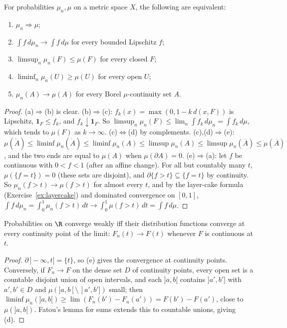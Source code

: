 \begin{theorem}[portmanteau]\label{thm:portmanteau}
For probabilities $\mu_n,\mu$ on a metric space $X$, the following are equivalent:
\begin{enumerate}[label=(\alph*)]
\item $\mu_n\Rightarrow\mu$;
\item $\int f\,d\mu_n\to\int f\,d\mu$ for every bounded Lipschitz $f$;
\item $\limsup_n\mu_n(F)\le\mu(F)$ for every closed $F$;
\item $\liminf_n\mu_n(U)\ge\mu(U)$ for every open $U$;
\item $\mu_n(A)\to\mu(A)$ for every Borel $\mu$-continuity set $A$.
\end{enumerate}
\end{theorem}
\begin{proof}
(a)$\Rightarrow$(b) is clear. (b)$\Rightarrow$(c): $f_k(x)=\max(0,1-k\,d(x,F))$ is Lipschitz, $\mathbf 1_F\le f_k$, and $f_k\downarrow\mathbf 1_F$. So $\limsup_n\mu_n(F)\le\lim_n\int f_k\,d\mu_n=\int f_k\,d\mu$, which tends to $\mu(F)$ as
$k\to\infty$. (c)$\Leftrightarrow$(d) by complements. (c),(d)$\Rightarrow$(e): $\mu(\mathring A)\le\liminf\mu_n(\mathring A)\le\liminf\mu_n(A)\le\limsup\mu_n(A)\le\limsup\mu_n(\overline A)\le\mu(\overline A)$, and the two ends are equal to
$\mu(A)$ when $\mu(\partial A)=0$. (e)$\Rightarrow$(a): let $f$ be continuous with $0<f<1$ (after an affine change). For all but countably many $t$, $\mu(\{f=t\})=0$ (these sets are disjoint), and $\partial\{f>t\}\subseteq\{f=t\}$ by continuity.
So $\mu_n(f>t)\to\mu(f>t)$ for almost every $t$, and by the layer-cake formula (Exercise~\ref{ex:layercake}) and dominated convergence on $[0,1]$,
$\int f\,d\mu_n=\int_0^1\mu_n(f>t)\,dt\to\int_0^1\mu(f>t)\,dt=\int f\,d\mu$.
\end{proof}

\begin{corollary}\label{cor:cdfweak}
Probabilities on $\R$ converge weakly iff their distribution functions converge at every continuity point of the limit: $F_n(t)\to F(t)$ whenever $F$ is continuous at $t$.
\end{corollary}
\begin{proof}
$\partial\,]-\infty,t]=\{t\}$, so (e) gives the convergence at continuity points. Conversely, if $F_n\to F$ on the dense set $D$ of continuity points, every open set is a countable disjoint union of open
intervals, and each $]a,b[$ contains $]a',b']$ with $a',b'\in D$ and $\mu(]a,b[\setminus\,]a',b'])$ small; then $\liminf\mu_n(]a,b[)\ge\lim(F_n(b')-F_n(a'))=F(b')-F(a')$, close to $\mu(]a,b[)$. Fatou's lemma for sums
extends this to countable unions, giving (d).
\end{proof}

